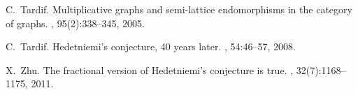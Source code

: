 \documentclass[11pt]{article}
\begin{document}
\begin{thebibliography}{10}
C.~Tardif.
\newblock Multiplicative graphs and semi-lattice endomorphisms in the category
  of graphs.
, 95(2):338--345, 2005.

C.~Tardif.
\newblock Hedetniemi's conjecture, 40 years later.
, 54:46--57, 2008.

X.~Zhu.
\newblock The fractional version of {H}edetniemi's conjecture is true.
, 32(7):1168--1175, 2011.

\end{thebibliography}

\end{document}
